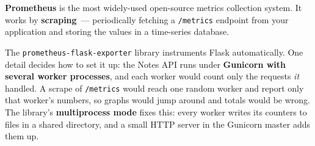 \textbf{Prometheus} is the most widely-used open-source metrics collection system. It works by \textbf{scraping}~--- periodically fetching a \texttt{/metrics} endpoint from your application and storing the values in a time-series database.

The \texttt{prometheus-}\allowbreak{}\texttt{flask-}\allowbreak{}\texttt{exporter} library instruments Flask automatically. One detail decides how to set it up: the Notes API runs under \textbf{Gunicorn with several worker processes}, and each worker would count only the requests \emph{it} handled. A scrape of \texttt{/metrics} would reach one random worker and report only that worker's numbers, so graphs would jump around and totals would be wrong. The library's \textbf{multiprocess mode} fixes this: every worker writes its counters to files in a shared directory, and a small HTTP server in the Gunicorn master adds them up.

\begin{codebox}[short]

\begin{Shaded}
\begin{Highlighting}[]
\end{Highlighting}
\end{Shaded}

\end{codebox}


